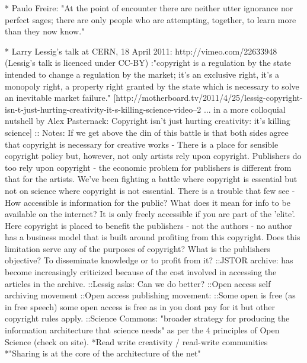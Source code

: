 * Paulo Freire: "At the point of encounter there are neither utter ignorance nor perfect sages; there are only people who are attempting, together, to learn more than they now know." 

* Larry Lessig's talk at CERN, 18 April 2011: http://vimeo.com/22633948 (Lessig's talk is licenced under CC-BY) 
:"copyright is a regulation by the state intended to change a regulation by the market; it's an exclusive right, it's a monopoly right, a property right granted by the state which is necessary to solve an inevitable market failure." [http://motherboard.tv/2011/4/25/lessig-copyright-isn-t-just-hurting-creativity-it-s-killing-science-video--2 ... in a more colloquial nutshell by Alex Pasternack: Copyright isn't just hurting creativity: it's killing science] 
:: Notes: If we get above the din of this battle is that both sides agree that copyright is necessary for creative works - There is a place for sensible copyright policy but, however, not only artists rely upon copyright. Publishers do too rely upon copyright - the economic problem for publishers is different from that for the artists. We've been fighting a battle where copyright is essential but not on science where copyright is not essential. There is a trouble that few see - How accessible is information for the public? What does it mean for info to be available on the internet? It is only freely accessible if you are part of the 'elite'. Here copyright is placed to benefit the publishers - not the authors - no author has a business model that is built around profiting from this copyright. Does this limitation serve any of the purposes of copyright? What is the publishers objective? To disseminate knowledge or to profit from it? 
::JSTOR archive: has become increasingly criticized because of the cost involved in accessing the articles in the archive. 
::Lessig asks: Can we do better? 
::Open access self archiving movement
::Open access publishing movement:
::Some open is free (as in free speech) some open access is free as in you dont pay for it but other copyright rules apply.
::Science Commons: "broader strategy for producing the information architecture that science needs" as per the 4 principles of Open Science (check on site).
*Read write creativity / read-write communities
*"Sharing is at the core of the architecture of the net"
